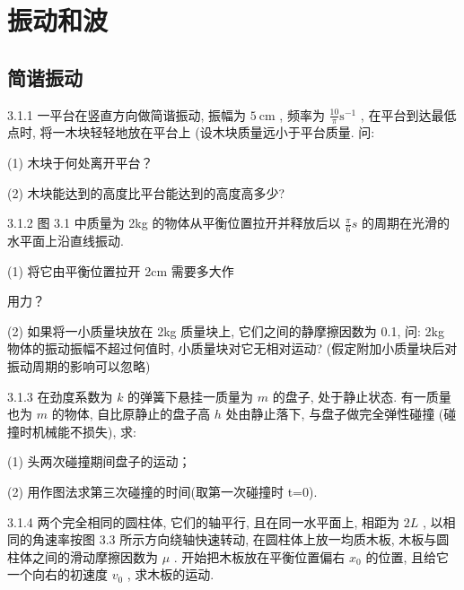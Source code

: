 \chapter{振动和波}

\section{简谐振动}

\begin{problem}{3.1.1}
一平台在竖直方向做简谐振动, 振幅为 $5 \mathrm{~cm}$ , 频率为 $\frac{10}{\pi} \mathrm{s}^{-1}$ , 在平台到达最低点时, 将一木块轻轻地放在平台上 (设木块质量远小于平台质量. 问:

(1) 木块于何处离开平台？

(2) 木块能达到的高度比平台能达到的高度高多少?
\end{problem}
\clearpage


\begin{problem}{3.1.2}
图 3.1 中质量为 2kg 的物体从平衡位置拉开并释放后以 $\frac{\pi}{6}s$ 的周期在光滑的水平面上沿直线振动.

(1) 将它由平衡位置拉开 2cm 需要多大作

用力？

(2) 如果将一小质量块放在 2kg 质量块上, 它们之间的静摩擦因数为 0.1, 问: 2kg 物体的振动振幅不超过何值时, 小质量块对它无相对运动? (假定附加小质量块后对振动周期的影响可以忽略)
\begin{center}

\end{center}
\end{problem}
\clearpage


\begin{problem}{3.1.3}
在劲度系数为 $k$ 的弹簧下悬挂一质量为 $m$ 的盘子, 处于静止状态. 有一质量也为 $m$ 的物体, 自比原静止的盘子高 $h$ 处由静止落下, 与盘子做完全弹性碰撞 (碰撞时机械能不损失), 求:

(1) 头两次碰撞期间盘子的运动；

(2) 用作图法求第三次碰撞的时间(取第一次碰撞时 t=0).
\end{problem}
\clearpage


\begin{problem}{3.1.4}
两个完全相同的圆柱体, 它们的轴平行, 且在同一水平面上, 相距为 $2L$ , 以相同的角速率按图 3.3 所示方向绕轴快速转动, 在圆柱体上放一均质木板, 木板与圆柱体之间的滑动摩擦因数为 $\mu$ . 开始把木板放在平衡位置偏右 $x_0$ 的位置, 且给它一个向右的初速度 $v_0$ , 求木板的运动.
\begin{center}

\end{center}
\end{problem}
\clearpage


